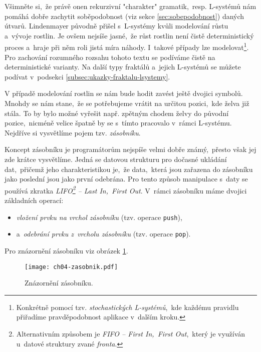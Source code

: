 Všimněte si,~že právě onen rekurzivní "charakter" gramatik,~resp. L-systémů nám pomáhá dobře zachytit soběpodobnost (viz sekce \ref{sec:sobepodobnost}) daných útvarů. Lindenmayer původně přišel s~L-systémy kvůli modelování růstu a~vývoje rostlin. Je ovšem nejsíše jasné,~že růst rostlin není čistě deterministický proces a~hraje při něm roli jistá míra náhody. \cite{Prusinkiewicz1990} I~takové případy lze modelovat\footnote{Konkrétně pomocí tzv. \emph{stochastických L-systémů},~kde každému pravidlu přiřadíme pravděpodobnost aplikace v~dalším kroku.}. Pro zachování rozumného rozsahu tohoto textu se podíváme čistě na deterministické varianty. Na další typy fraktálů a~jejich L-systémů se můžete podívat v~podsekci \ref{subsec:ukazky-fraktalu-lsystemy}.

V případě modelování rostlin se nám bude hodit zavést ještě dvojici symbolů. Mnohdy se nám stane,~že se potřebujeme vrátit na určitou pozici,~kde želva již stála. To by bylo možné vyřešit např. zpětným chodem želvy do původní pozice,~nicméně velice špatně by se s~tímto pracovalo v~rámci L-systému. Nejdříve si vysvětlíme pojem tzv. \emph{zásobníku}.

Koncept zásobníku je programátorům nejspíše velmi dobře známý,~přesto však jej zde krátce vysvětlíme. Jedná se datovou strukturu pro dočasné ukládání dat,~přičemž jeho charakteristikou je,~že data,~která jsou zařazena do zásobníku jako poslední jsou jako první odebrána. Pro tento způsob manipulace s~daty se používá zkratka \emph{LIFO\footnote{Alternativním způsobem je \emph{FIFO -- First In,~First Out},~který je využíván u~datové struktury zvané \emph{fronta}.} -- Last In,~First Out}. V~rámci zásobníku máme dvojici základních operací:
\begin{itemize}
    \item \emph{vložení prvku na vrchol zásobníku} (tzv. operace \texttt{push}),~
    \item a~\emph{odebrání prvku z~vrcholu zásobníku} (tzv. operace \texttt{pop}).
\end{itemize}
Pro znázornění zásobníku viz obrázek \ref{fig:zasobnik}.
\begin{figure}[h]
    \centering
    \texttt{[image: ch04-zasobnik.pdf]}
    \caption{Znázornění zásobníku.}
    \label{fig:zasobnik}
\end{figure}

